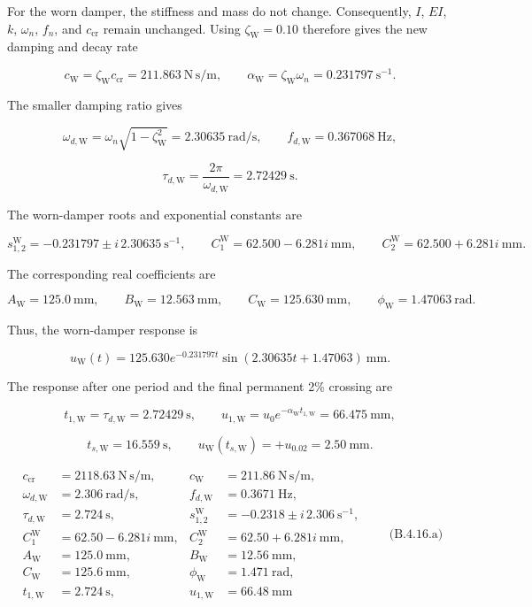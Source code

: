For the worn damper, the stiffness and mass do not change. Consequently, $I$, $EI$, $k$, $\omega_n$, $f_n$, and $c_{\mathrm{cr}}$ remain unchanged. Using $\zeta_{\mathrm{W}}=0.10$ therefore gives the new damping and decay rate

\[
c_{\mathrm{W}}=\zeta_{\mathrm{W}}c_{\mathrm{cr}}=211.863\ \mathrm{N\,s/m},
\qquad
\alpha_{\mathrm{W}}=\zeta_{\mathrm{W}}\omega_n=0.231797\ \mathrm{s^{-1}}.
\]

The smaller damping ratio gives

\[
\omega_{d,\mathrm{W}}=\omega_n\sqrt{1-\zeta_{\mathrm{W}}^2}=2.30635\ \mathrm{rad/s},
\qquad
f_{d,\mathrm{W}}=0.367068\ \mathrm{Hz},
\]

\[
\tau_{d,\mathrm{W}}=\frac{2\pi}{\omega_{d,\mathrm{W}}}=2.72429\ \mathrm{s}.
\]

The worn-damper roots and exponential constants are

\[
s_{1,2}^{\mathrm{W}}=-0.231797\pm i\,2.30635\ \mathrm{s^{-1}},
\qquad
C_1^{\mathrm{W}}=62.500-6.281i\ \mathrm{mm},
\qquad
C_2^{\mathrm{W}}=62.500+6.281i\ \mathrm{mm}.
\]

The corresponding real coefficients are

\[
A_{\mathrm{W}}=125.0\ \mathrm{mm},
\qquad
B_{\mathrm{W}}=12.563\ \mathrm{mm},
\qquad
C_{\mathrm{W}}=125.630\ \mathrm{mm},
\qquad
\phi_{\mathrm{W}}=1.47063\ \mathrm{rad}.
\]

Thus, the worn-damper response is

\[
u_{\mathrm{W}}(t)=125.630e^{-0.231797t}\sin(2.30635t+1.47063)\ \mathrm{mm}.
\]

The response after one period and the final permanent 2\% crossing are

\[
t_{1,\mathrm{W}}=\tau_{d,\mathrm{W}}=2.72429\ \mathrm{s},
\qquad
u_{1,\mathrm{W}}=u_0e^{-\alpha_{\mathrm{W}}t_{1,\mathrm{W}}}=66.475\ \mathrm{mm},
\]

\[
t_{s,\mathrm{W}}=16.559\ \mathrm{s},
\qquad
u_{\mathrm{W}}(t_{s,\mathrm{W}})=+u_{0.02}=2.50\ \mathrm{mm}.
\]

\[
\boxed{
\begin{aligned}
c_{\mathrm{cr}}&=2118.63\ \mathrm{N\,s/m},& c_{\mathrm{W}}&=211.86\ \mathrm{N\,s/m},\\
\omega_{d,\mathrm{W}}&=2.306\ \mathrm{rad/s},& f_{d,\mathrm{W}}&=0.3671\ \mathrm{Hz},\\
\tau_{d,\mathrm{W}}&=2.724\ \mathrm{s},& s_{1,2}^{\mathrm{W}}&=-0.2318\pm i\,2.306\ \mathrm{s^{-1}},\\
C_1^{\mathrm{W}}&=62.50-6.281i\ \mathrm{mm},& C_2^{\mathrm{W}}&=62.50+6.281i\ \mathrm{mm},\\
A_{\mathrm{W}}&=125.0\ \mathrm{mm},& B_{\mathrm{W}}&=12.56\ \mathrm{mm},\\
C_{\mathrm{W}}&=125.6\ \mathrm{mm},& \phi_{\mathrm{W}}&=1.471\ \mathrm{rad},\\
t_{1,\mathrm{W}}&=2.724\ \mathrm{s},& u_{1,\mathrm{W}}&=66.48\ \mathrm{mm}
\end{aligned}}
\qquad\text{(B.4.16.a)}
\]

